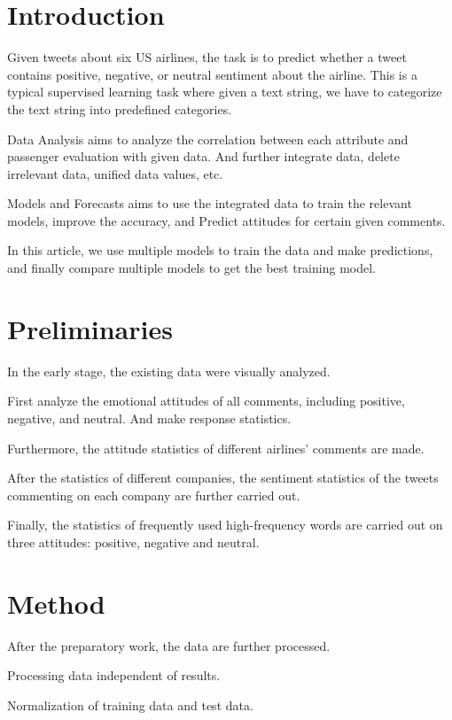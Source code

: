 \section{Introduction}
\label{sec-intro}
Given tweets about six US airlines, the task is to predict whether a tweet contains positive, 
negative, or neutral sentiment about the airline. This is a typical supervised learning task where
 given a text string, we have to categorize the text string into predefined categories.

 Data Analysis aims to analyze the correlation between each attribute and passenger evaluation with given data. And further integrate data, delete irrelevant
  data, unified data values, etc.

  Models and Forecasts aims to use the integrated data to train the relevant models, 
  improve the accuracy, and Predict attitudes for certain given comments.

  In this article, we use multiple models to train the data and make predictions, and
   finally compare multiple models to get the best training model.

\section{Preliminaries} \label{sec-preliminaries}

In the early stage, the existing data were visually analyzed.

First analyze the emotional attitudes of all comments, including positive, negative, and neutral. And make response statistics.

Furthermore, the attitude statistics of different airlines’ comments are made.

After the statistics of different companies, the sentiment statistics of the tweets 
commenting on each company are further carried out.

Finally, the statistics of frequently used high-frequency words are carried out on three attitudes: positive, negative and neutral.

\section{Method} \label{sec-method}


After the preparatory work, the data are further processed.

Processing data independent of results.

Normalization of training data and test data.

